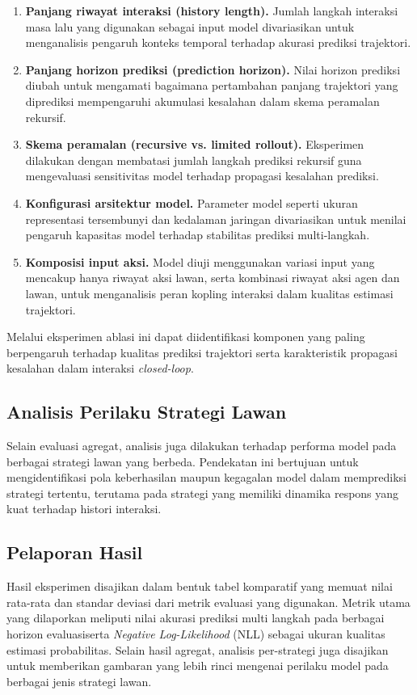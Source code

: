 \begin{enumerate}

\item \textbf{Panjang riwayat interaksi (history length).}  
Jumlah langkah interaksi masa lalu yang digunakan sebagai input model divariasikan untuk menganalisis pengaruh konteks temporal terhadap akurasi prediksi trajektori.

\item \textbf{Panjang horizon prediksi (prediction horizon).}  
Nilai horizon prediksi diubah untuk mengamati bagaimana pertambahan panjang trajektori yang diprediksi mempengaruhi akumulasi kesalahan dalam skema peramalan rekursif.

\item \textbf{Skema peramalan (recursive vs. limited rollout).}  
Eksperimen dilakukan dengan membatasi jumlah langkah prediksi rekursif guna mengevaluasi sensitivitas model terhadap propagasi kesalahan prediksi.

\item \textbf{Konfigurasi arsitektur model.}  
Parameter model seperti ukuran representasi tersembunyi dan kedalaman jaringan divariasikan untuk menilai pengaruh kapasitas model terhadap stabilitas prediksi multi-langkah.

\item \textbf{Komposisi input aksi.}  
Model diuji menggunakan variasi input yang mencakup hanya riwayat aksi lawan, serta kombinasi riwayat aksi agen dan lawan, untuk menganalisis peran kopling interaksi dalam kualitas estimasi trajektori.

\end{enumerate}

Melalui eksperimen ablasi ini dapat diidentifikasi komponen yang paling berpengaruh terhadap kualitas prediksi trajektori serta karakteristik propagasi kesalahan dalam interaksi \textit{closed-loop}.

\subsection{Analisis Perilaku Strategi Lawan}

Selain evaluasi agregat, analisis juga dilakukan terhadap performa model pada berbagai strategi lawan yang berbeda. Pendekatan ini bertujuan untuk mengidentifikasi pola keberhasilan maupun kegagalan model dalam memprediksi strategi tertentu, terutama pada strategi yang memiliki dinamika respons yang kuat terhadap histori interaksi.

\subsection{Pelaporan Hasil}

Hasil eksperimen disajikan dalam bentuk tabel komparatif yang memuat nilai rata-rata dan standar deviasi dari metrik evaluasi yang digunakan. Metrik utama yang dilaporkan meliputi nilai akurasi prediksi multi langkah pada berbagai horizon evaluasiserta \textit{Negative Log-Likelihood} (NLL) sebagai ukuran kualitas estimasi probabilitas. Selain hasil agregat, analisis per-strategi juga disajikan untuk memberikan gambaran yang lebih rinci mengenai perilaku model pada berbagai jenis strategi lawan.